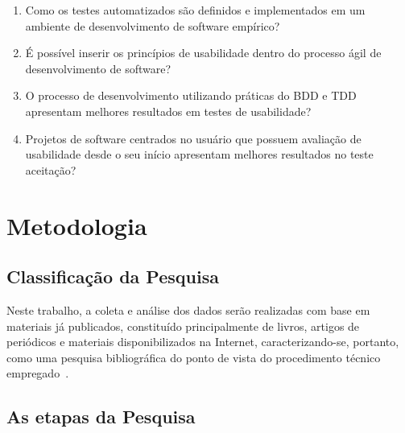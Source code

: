 \begin{enumerate}
\item Como os testes automatizados são definidos e implementados em um ambiente de desenvolvimento de software empírico?
\item É possível inserir os princípios de usabilidade dentro do processo ágil de desenvolvimento de software?
\item O processo de desenvolvimento utilizando práticas do BDD e TDD apresentam melhores resultados em testes de usabilidade?
\item Projetos de software centrados no usuário que possuem avaliação de usabilidade desde o seu início apresentam melhores resultados no teste aceitação?
\end{enumerate}
	 
\section{Metodologia}

\subsection{Classificação da Pesquisa}

Neste trabalho, a coleta e análise dos dados serão realizadas com base em  materiais já publicados, constituído principalmente de livros, artigos de periódicos e  materiais disponibilizados na Internet, caracterizando-se, portanto, como uma pesquisa bibliográfica do ponto de vista do procedimento técnico empregado~\cite{gil1991}.


\subsection{As etapas da Pesquisa}

